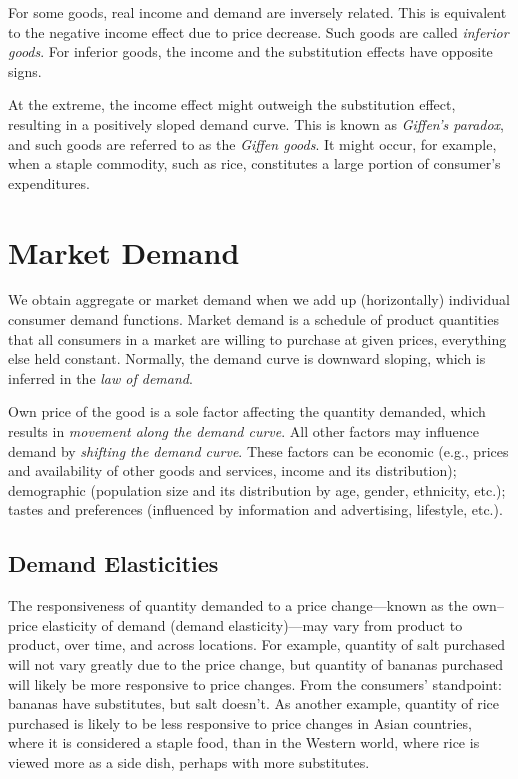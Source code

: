 \documentclass[
  oneside]{book}
\begin{document}
For some goods, real income and demand are inversely related. This is equivalent to the negative income effect due to price decrease. Such goods are called \emph{inferior goods}. For inferior goods, the income and the substitution effects have opposite signs.

At the extreme, the income effect might outweigh the substitution effect, resulting in a positively sloped demand curve. This is known as \emph{Giffen's paradox}, and such goods are referred to as the \emph{Giffen goods}. It might occur, for example, when a staple commodity, such as rice, constitutes a large portion of consumer's expenditures.

\hypertarget{market-demand}{%
\section{Market Demand}\label{market-demand}}

We obtain aggregate or market demand when we add up (horizontally) individual consumer demand functions. Market demand is a schedule of product quantities that all consumers in a market are willing to purchase at given prices, everything else held constant. Normally, the demand curve is downward sloping, which is inferred in the \emph{law of demand}.

Own price of the good is a sole factor affecting the quantity demanded, which results in \emph{movement along the demand curve}. All other factors may influence demand by \emph{shifting the demand curve}. These factors can be economic (e.g., prices and availability of other goods and services, income and its distribution); demographic (population size and its distribution by age, gender, ethnicity, etc.); tastes and preferences (influenced by information and advertising, lifestyle, etc.).

\hypertarget{demand-elasticities}{%
\subsection{Demand Elasticities}\label{demand-elasticities}}

The responsiveness of quantity demanded to a price change---known as the own--price elasticity of demand (demand elasticity)---may vary from product to product, over time, and across locations. For example, quantity of salt purchased will not vary greatly due to the price change, but quantity of bananas purchased will likely be more responsive to price changes. From the consumers' standpoint: bananas have substitutes, but salt doesn't. As another example, quantity of rice purchased is likely to be less responsive to price changes in Asian countries, where it is considered a staple food, than in the Western world, where rice is viewed more as a side dish, perhaps with more substitutes.
\end{document}
